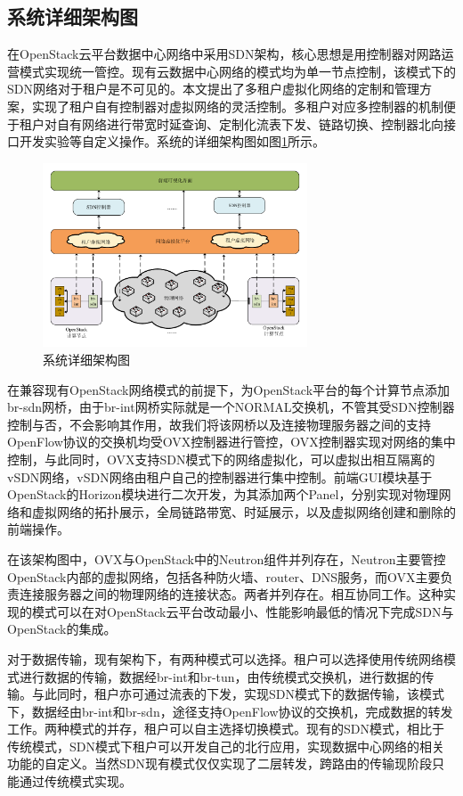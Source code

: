 \subsection{系统详细架构图}
在OpenStack云平台数据中心网络中采用SDN架构，核心思想是用控制器对网路运营模式实现统一管控。现有云数据中心网络的模式均为单一节点控制，该模式下的SDN网络对于租户是不可见的。本文提出了多租户虚拟化网络的定制和管理方案，实现了租户自有控制器对虚拟网络的灵活控制。多租户对应多控制器的机制便于租户对自有网络进行带宽时延查询、定制化流表下发、链路切换、控制器北向接口开发实验等自定义操作。系统的详细架构图如图\ref{fig:architecture}所示。

\begin{figure}[!htb]
  \centering
  \includegraphics[width=0.7\textwidth]{logo/architecture}
  \caption{系统详细架构图}
  \label{fig:architecture}
\end{figure}

在兼容现有OpenStack网络模式的前提下，为OpenStack平台的每个计算节点添加br-sdn网桥，由于br-int网桥实际就是一个NORMAL交换机，不管其受SDN控制器控制与否，不会影响其作用，故我们将该网桥以及连接物理服务器之间的支持OpenFlow协议的交换机均受OVX控制器进行管控，OVX控制器实现对网络的集中控制，与此同时，OVX支持SDN模式下的网络虚拟化，可以虚拟出相互隔离的vSDN网络，vSDN网络由租户自己的控制器进行集中控制。前端GUI模块基于OpenStack的Horizon模块进行二次开发，为其添加两个Panel，分别实现对物理网络和虚拟网络的拓扑展示，全局链路带宽、时延展示，以及虚拟网络创建和删除的前端操作。

在该架构图中，OVX与OpenStack中的Neutron组件并列存在，Neutron主要管控OpenStack内部的虚拟网络，包括各种防火墙、router、DNS服务，而OVX主要负责连接服务器之间的物理网络的连接状态。两者并列存在。相互协同工作。这种实现的模式可以在对OpenStack云平台改动最小、性能影响最低的情况下完成SDN与OpenStack的集成。

对于数据传输，现有架构下，有两种模式可以选择。租户可以选择使用传统网络模式进行数据的传输，数据经br-int和br-tun，由传统模式交换机，进行数据的传输。与此同时，租户亦可通过流表的下发，实现SDN模式下的数据传输，该模式下，数据经由br-int和br-sdn，途径支持OpenFlow协议的交换机，完成数据的转发工作。两种模式的并存，租户可以自主选择切换模式。现有的SDN模式，相比于传统模式，SDN模式下租户可以开发自己的北行应用，实现数据中心网络的相关功能的自定义。当然SDN现有模式仅仅实现了二层转发，跨路由的传输现阶段只能通过传统模式实现。

